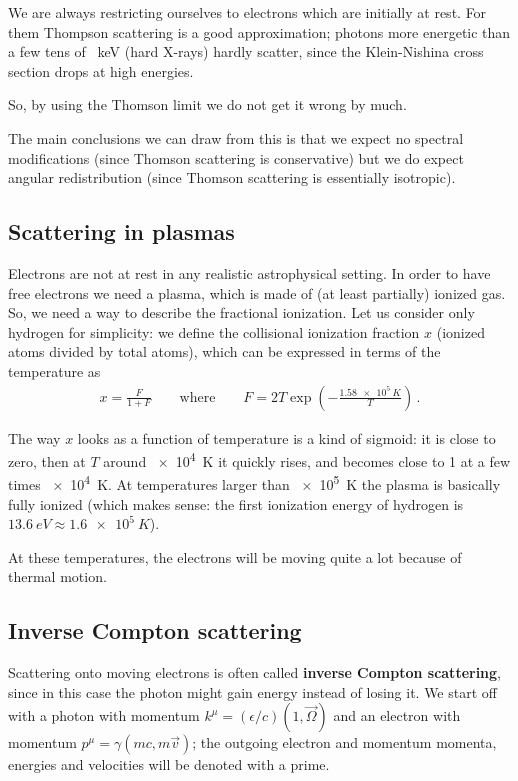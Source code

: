 \documentclass[main.tex]{subfiles}
\begin{document}
We are always restricting ourselves to electrons which are initially at rest. For them Thompson scattering is a good approximation; photons more energetic than a few tens of \SI{}{keV} (hard X-rays) hardly scatter, since the Klein-Nishina cross section drops at high energies.

So, by using the Thomson limit we do not get it wrong by much. 

The main conclusions we can draw from this is that we expect no spectral modifications (since Thomson scattering is conservative) but we do expect angular redistribution (since Thomson scattering is essentially isotropic).

\subsection{Scattering in plasmas}

Electrons are not at rest in any realistic astrophysical setting. In order to have free electrons we need a plasma, which is made of (at least partially) ionized gas. 
So, we need a way to describe the fractional ionization.
Let us consider only hydrogen for simplicity: we define the collisional ionization fraction \(x\) (ionized atoms divided by total atoms), which can be expressed in terms of the temperature as 
%
\begin{align}
x = \frac{F}{1 + F} 
\qquad \text{where} \qquad
F = 2T \exp(-\frac{\SI{1.58e5}{K}}{T})
\,.
\end{align}

The way \(x\) looks as a function of temperature is a kind of sigmoid: it is close to zero, then at \(T\) around \SI{e4}{K} it quickly rises, and becomes close to 1 at a few times \SI{e4}{K}. At temperatures larger than \SI{e5}{K} the plasma is basically fully ionized (which makes sense: the first ionization energy of hydrogen is \(\SI{13.6}{eV} \approx \SI{1.6e5}{K}\)). 

At these temperatures, the electrons will be moving quite a lot because of thermal motion. 

\subsection{Inverse Compton scattering}

Scattering onto moving electrons is often called \textbf{inverse Compton scattering}, since in this case the photon might gain energy instead of losing it. 
We start off with a photon with momentum \(k^{\mu } = (\epsilon /c) (1, \vec{\Omega})\) and an electron with momentum \(p^{\mu } = \gamma (mc, m \vec{v})\); the outgoing electron and momentum momenta, energies and velocities will be denoted with a prime. 
\end{document}
